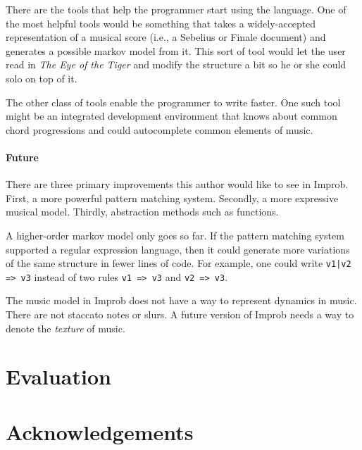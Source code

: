 \documentclass{sigplanconf-pldi15}
\begin{document}
There are the tools that help the programmer start using the language. One of the most helpful tools would be something that takes a widely-accepted representation of a musical score (i.e., a Sebelius or Finale document) and generates a possible markov model from it. This sort of tool would let the user read in \textit{The Eye of the Tiger} and modify the structure a bit so he or she could solo on top of it.

The other class of tools enable the programmer to write faster. One such tool might be an integrated development environment that knows about common chord progressions and could autocomplete common elements of music.

\paragraph{Future}
There are three primary improvements this author would like to see in Improb. First, a more powerful pattern matching system. Secondly, a more expressive musical model. Thirdly, abstraction methods such as functions.

A higher-order markov model only goes so far. If the pattern matching system supported a regular expression language, then it could generate more variations of the same structure in fewer lines of code. For example, one could write \texttt{v1|v2 => v3} instead of two rules \texttt{v1 => v3} and \texttt{v2 => v3}.

The music model in Improb does not have a way to represent dynamics in music. There are not staccato notes or slurs. A future version of Improb needs a way to denote the \textit{texture} of music.

\section{Evaluation}


\section{Acknowledgements}




\end{document}
